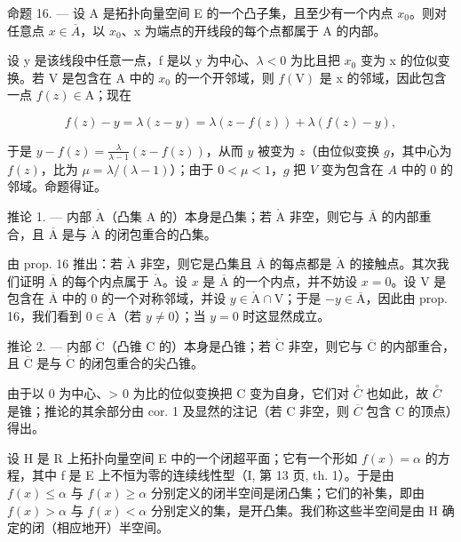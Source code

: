 命题 16. --- 设 A 是拓扑向量空间 E 的一个凸子集，且至少有一个内点 \(x_{0}\)。则对任意点 \(x \in \overline{A}\)，以 \(x_{0}\)、x 为端点的开线段的每个点都属于 A 的内部。

设 y 是该线段中任意一点，f 是以 y 为中心、\(\lambda < 0\) 为比且把 \(x_{0}\) 变为 x 的位似变换。若 V 是包含在 A 中的 \(x_{0}\) 的一个开邻域，则 \(f(\mathrm{V})\) 是 x 的邻域，因此包含一点 \(f(z) \in \mathrm{A}\)；现在

\[
f (z) - y = \lambda (z - y) = \lambda (z - f (z)) + \lambda (f (z) - y),
\]

于是 \(y - f(z) = \frac{\lambda}{\lambda - 1} (z - f(z))\)，从而 \(y\) 被变为 \(z\)（由位似变换 \(g\)，其中心为 \(f(z)\)，比为 \(\mu = \lambda / (\lambda - 1)\)）；由于 \(0 < \mu < 1\)，\(g\) 把 \(V\) 变为包含在 \(A\) 中的 0 的邻域。命题得证。

推论 1. --- 内部 \(\mathring{\mathrm{A}}\)（凸集 \(\mathrm{A}\) 的）本身是凸集；若 \(\mathring{\mathrm{A}}\) 非空，则它与 \(\overline{\mathrm{A}}\) 的内部重合，且 \(\overline{\mathrm{A}}\) 是与 \(\mathring{\mathrm{A}}\) 的闭包重合的凸集。

由 prop. 16 推出：若 \(\mathring{\mathrm{A}}\) 非空，则它是凸集且 \(\overline{\mathrm{A}}\) 的每点都是 \(\mathring{\mathrm{A}}\) 的接触点。其次我们证明 \(\overline{\mathrm{A}}\) 的每个内点属于 \(\mathring{\mathrm{A}}\)。设 \(x\) 是 \(\overline{\mathrm{A}}\) 的一个内点，并不妨设 \(x = 0\)。设 \(\mathrm{V}\) 是包含在 \(\overline{\mathrm{A}}\) 中的 0 的一个对称邻域，并设 \(y \in \mathring{\mathrm{A}} \cap \mathrm{V}\)；于是 \(-y \in \overline{\mathrm{A}}\)，因此由 prop. 16，我们看到 \(0 \in \mathring{\mathrm{A}}\)（若 \(y \neq 0\)）；当 \(y = 0\) 时这显然成立。

推论 2. --- 内部 \(\mathring{\mathrm{C}}\)（凸锥 \(\mathrm{C}\) 的）本身是凸锥；若 \(\mathring{\mathrm{C}}\) 非空，则它与 \(\overline{\mathrm{C}}\) 的内部重合，且 \(\overline{\mathrm{C}}\) 是与 \(\mathring{\mathrm{C}}\) 的闭包重合的尖凸锥。

由于以 0 为中心、\textgreater{} 0 为比的位似变换把 C 变为自身，它们对 \(\overset{\circ}{C}\) 也如此，故 \(\overset{\circ}{C}\) 是锥；推论的其余部分由 cor. 1 及显然的注记（若 C 非空，则 \(\overline{C}\) 包含 C 的顶点）得出。

设 H 是 R 上拓扑向量空间 E 中的一个闭超平面；它有一个形如 \(f(x) = \alpha\) 的方程，其中 f 是 E 上不恒为零的连续线性型（I, 第 13 页, th. 1）。于是由 \(f(x) \leqslant \alpha\) 与 \(f(x) \geqslant \alpha\) 分别定义的闭半空间是闭凸集；它们的补集，即由 \(f(x) > \alpha\) 与 \(f(x) < \alpha\) 分别定义的集，是开凸集。我们称这些半空间是由 H 确定的闭（相应地开）半空间。

